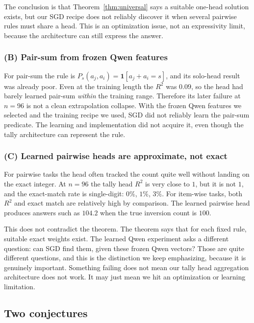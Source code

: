 \documentclass[10pt]{article}
\theoremstyle{definition}
\begin{document}
The conclusion is that Theorem~\ref{thm:universal} says a suitable
one-head solution exists, but our SGD recipe does not reliably discover it
when several pairwise rules must share a head. This is an optimization
issue, not an expressivity limit, because the architecture can still
express the answer.

\subsubsection*{(B) Pair-sum from frozen Qwen features}

For pair-sum the rule is $P_s(a_j, a_i) = \mathbf{1}[a_j + a_i = s]$, and
its solo-head result was already poor. Even at the training length the
$R^2$ was $0.09$, so the head had barely learned pair-sum \emph{within}
the training range. Therefore its later failure at $n = 96$ is not a clean
extrapolation collapse. With the frozen Qwen features we selected and the
training recipe we used, SGD did not reliably learn the pair-sum
predicate. The learning and implementation did not acquire it, even though
the tally architecture can represent the rule.

\subsubsection*{(C) Learned pairwise heads are approximate, not exact}

For pairwise tasks the head often tracked the count quite well without
landing on the exact integer. At $n = 96$ the tally head $R^2$ is very
close to $1$, but it is not $1$, and the exact-match rate is single-digit:
$0\%$, $1\%$, $3\%$. For item-wise tasks, both $R^2$ and exact match are
relatively high by comparison. The learned pairwise head produces answers
such as $104.2$ when the true inversion count is $100$.

This does not contradict the theorem. The theorem says that for each fixed
rule, suitable exact weights exist. The learned Qwen experiment asks a
different question: can SGD find them, given these frozen Qwen vectors?
Those are quite different questions, and this is the distinction we keep
emphasizing, because it is genuinely important. Something failing does not
mean our tally head aggregation architecture does not work. It may just
mean we hit an optimization or learning limitation.

\subsection{Two conjectures}
\label{sec:conj1}\label{sec:conj2}
\end{document}
